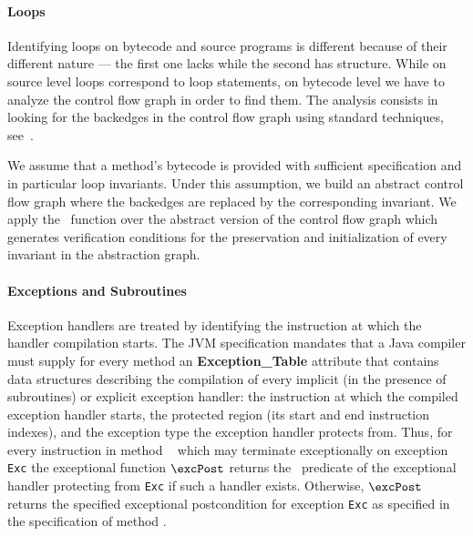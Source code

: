 \paragraph*{Loops}
Identifying loops on bytecode and source programs is different because of their different nature --- 
the first one lacks while the second has structure. While on source level loops correspond to loop statements,  
on bytecode level we have to analyze the control flow graph in order to find them.
 The analysis consists in looking for the backedges in the control flow graph using standard techniques, see~\cite{ARUCom1986}. 
  
 We assume that a method's bytecode is provided with sufficient specification and in particular loop invariants.
 Under this assumption, we build an abstract control flow graph where the backedges are replaced by
 the corresponding invariant. We apply the \wpi \ function over the abstract version of the control flow graph which generates verification conditions for the 
preservation and initialization of every invariant in the abstraction graph. 


     

\paragraph*{Exceptions and Subroutines}
Exception handlers are treated by identifying the instruction at which the handler compilation starts. The JVM specification mandates 
that a Java compiler must supply for every method an \textbf{Exception\_Table} attribute that contains data structures describing the compilation of every implicit (in the presence of subroutines) or explicit exception handler: the instruction at which the compiled exception handler starts,
 the protected region (its start and end instruction indexes), and the exception type the exception handler protects from. Thus, 
for every instruction  in method \method~ which may terminate exceptionally on exception \texttt{Exc} the exceptional function
 $\excPost$  returns the \wpi \ predicate of the exceptional handler protecting  from \texttt{Exc} if such a handler exists.
Otherwise, $\excPost$ returns the specified exceptional postcondition for exception \texttt{Exc} as specified in the specification of
method \method.

